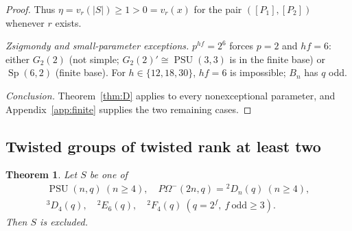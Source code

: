 \documentclass[11pt]{amsart}
\newtheorem{theorem}{Theorem}[section]
\theoremstyle{definition}
\theoremstyle{remark}
\DeclareMathOperator{\PSU}{PSU}
\DeclareMathOperator{\Sp}{Sp}
\newcommand{\vp}[1]{v_{#1}}
\begin{document}
\begin{proof}
Thus $\eta=\vp{r}(|S|)\geq1>0=\vp{r}(x)$ for the pair $([P_1],[P_2])$
whenever $r$ exists.

\emph{Zsigmondy and small-parameter exceptions.} $p^{hf}=2^6$ forces $p=2$ and $hf=6$:
either $G_2(2)$ (not simple; $G_2(2)'\cong\PSU(3,3)$ is in the finite
base) or $\Sp(6,2)$ (finite base). For $h\in\{12,18,30\}$, $hf=6$ is
impossible; $B_n$ has $q$ odd.

\emph{Conclusion.} Theorem~\ref{thm:D} applies to every nonexceptional
parameter, and Appendix~\ref{app:finite} supplies the two remaining cases.
\end{proof}

\subsection{Twisted groups of twisted rank at least two}\label{app:twisted2}

\begin{theorem}\label{thm:twisted2}
Let $S$ be one of
\[
\begin{gathered}
\PSU(n,q)\ (n\geq4),\quad
P\Omega^-(2n,q)={}^2D_n(q)\ (n\geq4),\\
{}^3D_4(q),\quad {}^2E_6(q),\quad
{}^2F_4(q)\ (q=2^f,\ f\ \text{odd}\geq3).
\end{gathered}
\]
Then $S$ is excluded.
\end{theorem}
\end{document}
